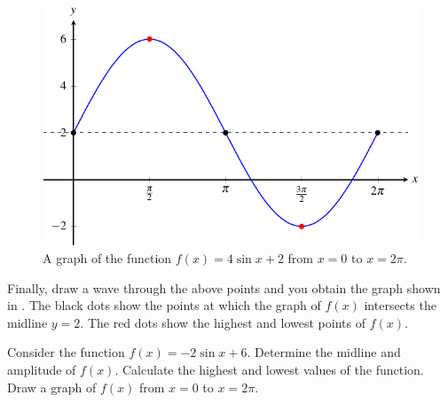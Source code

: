 \documentclass[a4paper,oneside,12pt]{article}
\begin{document}
{\begin{solution}
\begin{figure}[!htbp]
\centering
\includegraphics[scale=1.1]{image/13/4-sin-2.pdf}
\caption{%
  A graph of the function $f(x) = 4 \sin x + 2$ from $x = 0$ to
  $x = 2\pi$.
}
\label{fig:trigonometric:4_sinx_2}
\end{figure}

Finally, draw a wave through the above points and you obtain the graph
shown in .  The black dots show the
points at which the graph of $f(x)$ intersects the midline $y = 2$.
The red dots show the highest and lowest points of $f(x)$.
\end{solution}
}{}

\begin{exercise}
Consider the function $f(x) = -2 \sin x + 6$.  Determine the midline
and amplitude of $f(x)$.  Calculate the highest and lowest values of
the function.  Draw a graph of $f(x)$ from $x = 0$ to $x = 2\pi$.
\end{exercise}
\end{document}
